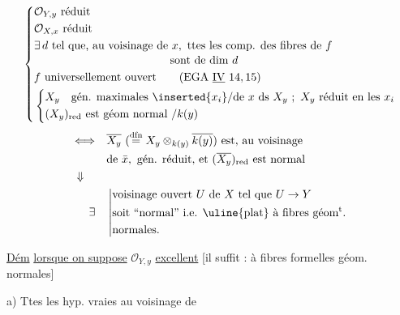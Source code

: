 \[
\left\{\begin{aligned}
&\mathcal O_{Y,y}\ \text{réduit}\\
&\mathcal O_{X,x}\ \text{réduit}\\
&\exists\,d\ \text{tel que, au voisinage de }x,\ \text{ttes les comp. des fibres de } f\\[-2pt]
&\hspace{12em}\text{sont de dim }d\\
& f\ \text{universellement ouvert}\qquad(\text{EGA }\underline{\mathrm{IV}}\ 14,15)\\
&\left\{\begin{aligned}
&X_y\quad\text{gén. maximales }\inserted{x_i}/\text{de }x\text{ ds }X_y\ ;\ X_y\ \text{réduit en les }x_i\\
&(X_y)_{\text{red}}\ \text{est géom normal }/k(y)
\end{aligned}\right.
\end{aligned}\right.
\]
\[
\begin{aligned}
\Longleftrightarrow\quad &\overline{X_y}\ (\overset{\text{dfn}}{=}X_y\otimes_{k(y)}\overline{k(y)})\ \text{est, au voisinage}\\
&\text{de }\bar x,\ \text{gén. réduit, et }(\overline{X_y})_{\text{red}}\ \text{est normal}\\
\Downarrow\qquad&\\
\exists\quad&\left|\begin{aligned}
&\text{voisinage ouvert }U\text{ de }X\text{ tel que }U\to Y\\
&\text{soit ``normal'' i.e. \uline{plat} à fibres géom\textsuperscript{t}.}\\
&\text{normales.}
\end{aligned}\right.
\end{aligned}
\]

\uline{Dém} \uline{lorsque on suppose} $\mathcal O_{Y,y}$ \uline{excellent} [il suffit : à fibres formelles géom. normales]

a) Ttes les hyp.   vraies au voisinage  de 

